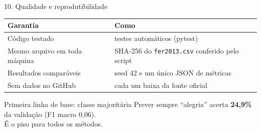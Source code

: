 \documentclass[aspectratio=169,t,xcolor=table]{beamer}
\newcommand{\code}[1]{\texttt{#1}}
\begin{document}
\begin{frame}{10. Qualidade e reprodutibilidade}

    \begin{table}[]
        \centering
        \footnotesize
        \renewcommand{\arraystretch}{1.3}
        \setlength{\tabcolsep}{8pt}
        {
            \begin{tabular}{>{\raggedright\arraybackslash}p{3.4cm}>{\raggedright\arraybackslash}p{7.2cm}}
                \toprule
                \textbf{Garantia}        & \textbf{Como}                                                        \\
                \midrule
                Código testado           & 87 testes automáticos (pytest)                                      \\
                Mesmo arquivo em toda máquina & SHA-256 do \code{fer2013.csv} conferido pelo script              \\
                Resultados comparáveis   & seed 42 e um único JSON de métricas                                 \\
                Sem dados no GitHub      & cada um baixa da fonte oficial                                      \\
                \bottomrule
            \end{tabular}
        }
    \end{table}

    \begin{block}{Primeira linha de base: classe majoritária}
        Prever sempre ``alegria'' acerta \textbf{24,9\%} da validação (F1 macro 0,06).\\
        É o piso para todos os métodos.
    \end{block}\par
    \vspace{\fill}

\end{frame}
\end{document}
